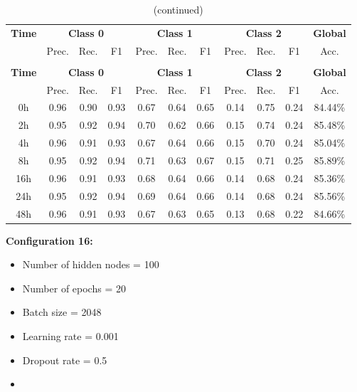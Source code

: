 \documentclass[12pt,oneside]{book} %
\begin{document}
\setlength\LTleft{1cm}
\begin{longtable}{ c ccc ccc ccc c}
\caption{Performance metrics of the LNN model for configuration 15} \\
\toprule
\textbf{Time} & \multicolumn{3}{c}{\textbf{Class 0}} & \multicolumn{3}{c}{\textbf{Class 1}} & \multicolumn{3}{c}{\textbf{Class 2}} & \textbf{Global} \\
               & Prec. & Rec. & F1  & Prec. & Rec. & F1   & Prec. & Rec. & F1  & Acc. \\
\midrule
\endfirsthead

\caption[]{(continued)} \\
\toprule
\textbf{Time} & \multicolumn{3}{c}{\textbf{Class 0}} & \multicolumn{3}{c}{\textbf{Class 1}} & \multicolumn{3}{c}{\textbf{Class 2}} & \textbf{Global} \\
               & Prec. & Rec. & F1  & Prec. & Rec. & F1   & Prec. & Rec. & F1  & Acc. \\
\midrule
\endhead

\bottomrule
\endfoot

\bottomrule
\endlastfoot

0h   & 0.96  & 0.90 & 0.93 & 0.67  & 0.64 & 0.65  & 0.14  & 0.75 & 0.24 & 84.44\% \\
2h   & 0.95  & 0.92 & 0.94 & 0.70  & 0.62 & 0.66  & 0.15  & 0.74 & 0.24 & 85.48\% \\
4h   & 0.96  & 0.91 & 0.93 & 0.67  & 0.64 & 0.66  & 0.15  & 0.70 & 0.24 & 85.04\% \\
8h   & 0.95  & 0.92 & 0.94 & 0.71  & 0.63 & 0.67  & 0.15  & 0.71 & 0.25 & 85.89\% \\
16h  & 0.96  & 0.91 & 0.93 & 0.68  & 0.64 & 0.66  & 0.14  & 0.68 & 0.24 & 85.36\% \\
24h  & 0.95  & 0.92 & 0.94 & 0.69  & 0.64 & 0.66  & 0.14  & 0.68 & 0.24 & 85.56\% \\
48h  & 0.96  & 0.91 & 0.93 & 0.67  & 0.63 & 0.65  & 0.13  & 0.68 & 0.22 & 84.66\% \\
\end{longtable}

\noindent \textbf{Configuration 16:}
\begin{multicols}{2}
    \begin{itemize}
        \item Number of hidden nodes = 100
        \item Number of epochs = 20
        \item Batch size = 2048
    \end{itemize}
    \begin{itemize}
         \item Learning rate = 0.001
         \item Dropout rate  = 0.5
         \item[\hspace{0pt}]
    \end{itemize}
\end{multicols}
\end{document}
